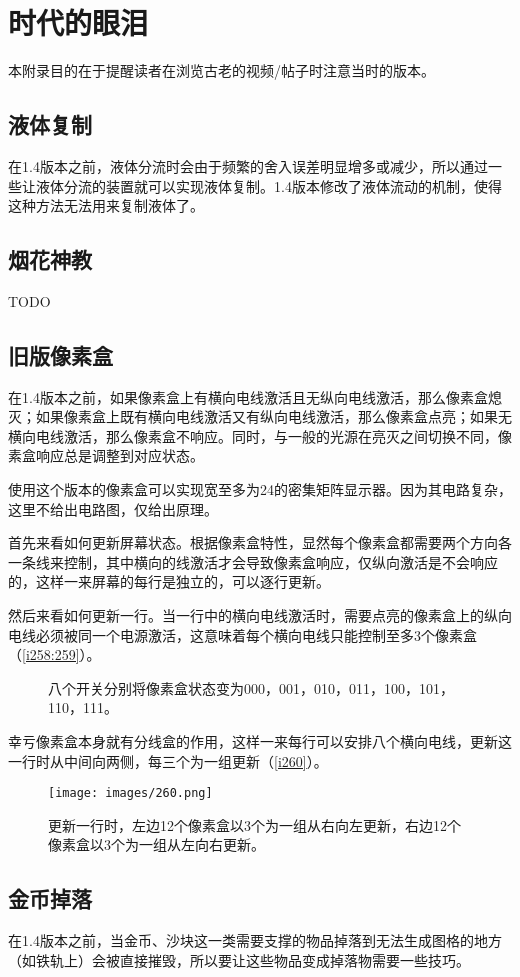 \chapter{时代的眼泪}
本附录目的在于提醒读者在浏览古老的视频/帖子时注意当时的版本。

\section{液体复制}
在1.4版本之前，液体分流时会由于频繁的舍入误差明显增多或减少，所以通过一些让液体分流的装置就可以实现液体复制。1.4版本修改了液体流动的机制，使得这种方法无法用来复制液体了。

\section{烟花神教}
TODO

\section{旧版像素盒}

在1.4版本之前，如果像素盒上有横向电线激活且无纵向电线激活，那么像素盒熄灭；如果像素盒上既有横向电线激活又有纵向电线激活，那么像素盒点亮；如果无横向电线激活，那么像素盒不响应。同时，与一般的光源在亮灭之间切换不同，像素盒响应总是调整到对应状态。

使用这个版本的像素盒可以实现宽至多为24的密集矩阵显示器。因为其电路复杂，这里不给出电路图，仅给出原理。

首先来看如何更新屏幕状态。根据像素盒特性，显然每个像素盒都需要两个方向各一条线来控制，其中横向的线激活才会导致像素盒响应，仅纵向激活是不会响应的，这样一来屏幕的每行是独立的，可以逐行更新。

然后来看如何更新一行。当一行中的横向电线激活时，需要点亮的像素盒上的纵向电线必须被同一个电源激活，这意味着每个横向电线只能控制至多3个像素盒（\autoref{i258:259}）。

\begin{figure}[!ht]
\begin{center}
\qquad
{}
\end{center}
\caption{八个开关分别将像素盒状态变为000，001，010，011，100，101，110，111。}
\label{i258:259}
\end{figure}

幸亏像素盒本身就有分线盒的作用，这样一来每行可以安排八个横向电线，更新这一行时从中间向两侧，每三个为一组更新（\autoref{i260}）。

\begin{figure}[!ht]
\centering
\texttt{[image: images/260.png]}
\caption{更新一行时，左边12个像素盒以3个为一组从右向左更新，右边12个像素盒以3个为一组从左向右更新。}
\label{i260}
\end{figure}

\section{金币掉落}
在1.4版本之前，当金币、沙块这一类需要支撑的物品掉落到无法生成图格的地方（如铁轨上）会被直接摧毁，所以要让这些物品变成掉落物需要一些技巧。